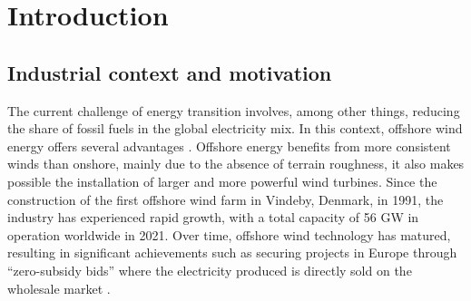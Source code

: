 \chapter*{Introduction}


\section*{Industrial context and motivation}

The current challenge of energy transition involves, among other things, reducing the share of fossil fuels in the global electricity mix. 
In this context, offshore wind energy offers several advantages \citep{eolien_en_mer_2022}. 
Offshore energy benefits from more consistent winds than onshore, mainly due to the absence of terrain roughness, it also makes possible the installation of larger and more powerful wind turbines. 
Since the construction of the first offshore wind farm in Vindeby, Denmark, in 1991, the industry has experienced rapid growth, with a total capacity of 56 GW in operation worldwide in 2021. 
Over time, offshore wind technology has matured, resulting in significant achievements such as securing projects in Europe through ``zero-subsidy bids'' where the electricity produced is directly sold on the wholesale market \citep{eolien_en_mer_2022}. 

